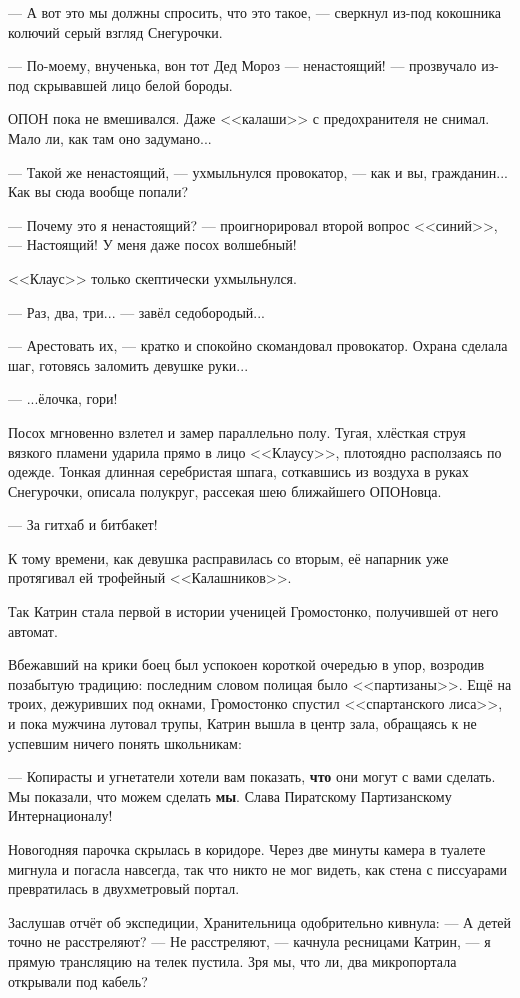 --- А вот это мы должны спросить, что это такое, --- сверкнул из-под кокошника колючий серый взгляд Снегурочки.

--- По-моему, внученька, вон тот Дед Мороз --- ненастоящий! --- прозвучало из-под скрывавшей лицо белой бороды.

ОПОН пока не вмешивался. Даже <<калаши>> с предохранителя не снимал. Мало ли, как там оно задумано...

--- Такой же ненастоящий, --- ухмыльнулся провокатор, --- как и вы, гражданин... Как вы сюда вообще попали?

--- Почему это я ненастоящий? --- проигнорировал второй вопрос <<синий>>, --- Настоящий! У меня даже посох волшебный!

<<Клаус>> только скептически ухмыльнулся.

--- Раз, два, три... --- завёл седобородый...

--- Арестовать их, --- кратко и спокойно скомандовал провокатор. Охрана сделала шаг, готовясь заломить девушке руки...

--- ...ёлочка, гори!

\emptypar

Посох мгновенно взлетел и замер параллельно полу.
Тугая, хлёсткая струя вязкого пламени ударила прямо в лицо <<Клаусу>>, плотоядно расползаясь по одежде.
Тонкая длинная серебристая шпага, соткавшись из воздуха в руках Снегурочки, описала полукруг, рассекая шею ближайшего ОПОНовца.


--- За гитхаб и битбакет! 

К тому времени, как девушка расправилась со вторым, её напарник уже протягивал ей трофейный <<Калашников>>.

Так Катрин стала первой в истории ученицей Громостонко, получившей от него автомат.

Вбежавший на крики боец был успокоен короткой очередью в упор, возродив позабытую традицию:
последним словом полицая было <<партизаны>>.
Ещё на троих, дежуривших под окнами, Громостонко спустил <<спартанского лиса>>, и пока мужчина лутовал трупы,
Катрин вышла в центр зала, обращаясь к не успевшим ничего понять школьникам:

--- Копирасты и угнетатели хотели вам показать, \textbf{что} они могут с вами сделать.
Мы показали, что можем сделать \textbf{мы}. Слава Пиратскому Партизанскому Интернационалу!

Новогодняя парочка скрылась в коридоре.
Через две минуты камера в туалете мигнула и погасла навсегда, так что никто не мог видеть,
как стена с писсуарами превратилась в двухметровый портал.


Заслушав отчёт об экспедиции, Хранительница одобрительно кивнула:
--- А детей точно не расстреляют?
--- Не расстреляют, --- качнула ресницами Катрин, --- я прямую трансляцию на телек пустила.
Зря мы, что ли, два микропортала открывали под кабель?


